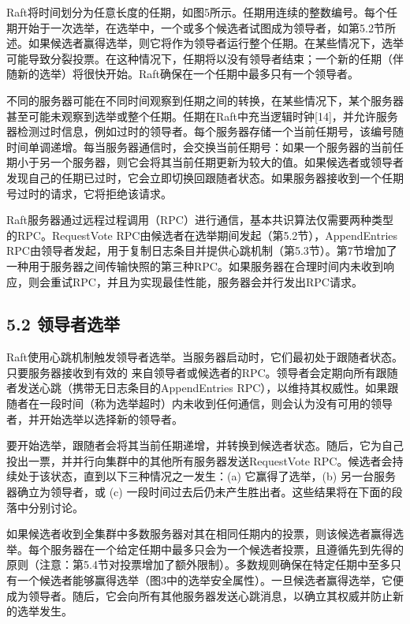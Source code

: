 \documentclass[12pt,a4paper]{report} %
\begin{document}
Raft将时间划分为任意长度的任期，如图5所示。任期用连续的整数编号。每个任期开始于一次选举，在选举中，一个或多个候选者试图成为领导者，如第5.2节所述。如果候选者赢得选举，则它将作为领导者运行整个任期。在某些情况下，选举可能导致分裂投票。在这种情况下，任期将以没有领导者结束；一个新的任期（伴随新的选举）将很快开始。Raft确保在一个任期中最多只有一个领导者。

不同的服务器可能在不同时间观察到任期之间的转换，在某些情况下，某个服务器甚至可能未观察到选举或整个任期。任期在Raft中充当逻辑时钟[14]，并允许服务器检测过时信息，例如过时的领导者。每个服务器存储一个当前任期号，该编号随时间单调递增。每当服务器通信时，会交换当前任期号：如果一个服务器的当前任期小于另一个服务器，则它会将其当前任期更新为较大的值。如果候选者或领导者发现自己的任期已过时，它会立即切换回跟随者状态。如果服务器接收到一个任期号过时的请求，它将拒绝该请求。

Raft服务器通过远程过程调用（RPC）进行通信，基本共识算法仅需要两种类型的RPC。RequestVote RPC由候选者在选举期间发起（第5.2节），AppendEntries RPC由领导者发起，用于复制日志条目并提供心跳机制（第5.3节）。第7节增加了一种用于服务器之间传输快照的第三种RPC。如果服务器在合理时间内未收到响应，则会重试RPC，并且为实现最佳性能，服务器会并行发出RPC请求。

\subsection*{5.2 领导者选举}

Raft使用心跳机制触发领导者选举。当服务器启动时，它们最初处于跟随者状态。只要服务器接收到有效的
来自领导者或候选者的RPC。领导者会定期向所有跟随者发送心跳（携带无日志条目的AppendEntries RPC），以维持其权威性。如果跟随者在一段时间（称为选举超时）内未收到任何通信，则会认为没有可用的领导者，并开始选举以选择新的领导者。

要开始选举，跟随者会将其当前任期递增，并转换到候选者状态。随后，它为自己投出一票，并并行向集群中的其他所有服务器发送RequestVote RPC。候选者会持续处于该状态，直到以下三种情况之一发生：(a) 它赢得了选举，(b) 另一台服务器确立为领导者，或 (c) 一段时间过去后仍未产生胜出者。这些结果将在下面的段落中分别讨论。

如果候选者收到全集群中多数服务器对其在相同任期内的投票，则该候选者赢得选举。每个服务器在一个给定任期中最多只会为一个候选者投票，且遵循先到先得的原则（注意：第5.4节对投票增加了额外限制）。多数规则确保在特定任期中至多只有一个候选者能够赢得选举（图3中的选举安全属性）。一旦候选者赢得选举，它便成为领导者。随后，它会向所有其他服务器发送心跳消息，以确立其权威并防止新的选举发生。
\end{document}

